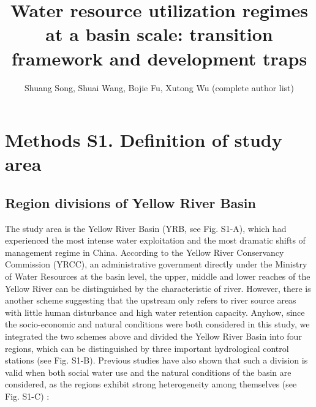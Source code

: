\documentclass[9pt,twoside,lineno]{pnas-new}
\title{Water resource utilization regimes at a basin scale: transition framework and development traps}
\author{Shuang Song, Shuai Wang, Bojie Fu, Xutong Wu (complete author list)}
\begin{document}

\maketitle




\newpage
\section*{Methods S1. Definition of study area}

\subsection*{Region divisions of Yellow River Basin}

The study area is the Yellow River Basin (YRB, see Fig. S1-A), which had experienced the most intense water exploitation and the most dramatic shifts of management regime in China. 
According to the Yellow River Conservancy Commission (YRCC), an administrative government directly under the Ministry of Water Resources at the basin level, the upper, middle and lower reaches of the Yellow River can be distinguished by the characteristic of river. 
However, there is another scheme suggesting that the upstream only refers to river source areas with little human disturbance and high water retention capacity.
Anyhow, since the socio-economic and natural conditions were both considered in this study, we integrated the two schemes above and divided the Yellow River Basin into four regions, which can be distinguished by three important hydrological control stations (see Fig. S1-B). 
Previous studies have also shown that such a division is valid when both social water use and the natural conditions of the basin are considered, as the regions exhibit strong heterogeneity among themselves (see Fig. S1-C) \cite{wangYellowRiverWater2019}:
\end{document}
